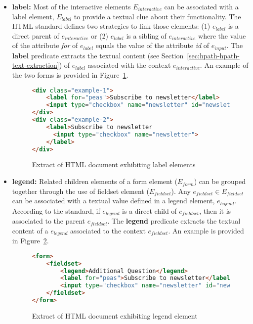 \begin{itemize}
    \item \textbf{label:} Most of the interactive elements $E_{interactive}$ can be associated with a label element, $E_{label}$ to provide a textual clue about their functionality. The HTML standard defines two strategies to link those elements: (1) $e_{label}$ is a direct parent of $e_{interactive}$ or (2) $e_{label}$ is a sibling of $e_{interactive}$ where the value of the attribute \emph{for} of $e_{label}$ equals the value of the attribute \emph{id} of $e_{input}$. The \textbf{label} predicate extracts the textual content (see Section~\ref{sec:hpath-hpath-text-extraction}) of $e_{label}$ associated with the context $e_{interactive}$. An example of the two forms is provided in Figure~\ref{fig:html-document-label}.
    
\begin{figure}[h]
\centering
\caption{Extract of HTML document exhibiting label elements}
\label{fig:html-document-label}
\begin{minipage}{0.8\linewidth}
\begin{lstlisting}[language=HTML]
<div class="example-1">
    <label for="peas">Subscribe to newsletter</label>
    <input type="checkbox" name="newsletter" id="newsletter">
</div>
<div class="example-2">
    <label>Subscribe to newsletter
      <input type="checkbox" name="newsletter">
    </label>
</div>
\end{lstlisting}
\end{minipage}
\end{figure}
    
    \item \textbf{legend:} Related children elements of a form element ($E_{form}$) can be grouped together through the use of fieldset element ($E_{fieldset}$). Any $e_{fieldset} \in E_{fieldset}$ can be associated with a textual value defined in a legend element, $e_{legend}$. According to the standard, if $e_{legend}$ is a direct child of $e_{fieldset}$, then it is associated to the parent $e_{fieldset}$. The \textbf{legend} predicate extracts the textual content of a $e_{legend}$ associated to the context $e_{fieldset}$. An example is provided in Figure~\ref{fig:html-document-legend}.

\begin{figure}[h]
\centering
\caption{Extract of HTML document exhibiting legend element}
\label{fig:html-document-legend}
\begin{minipage}{0.8\linewidth}
\begin{lstlisting}[language=HTML]
<form>
    <fieldset>
        <legend>Additional Question</legend>
        <label for="peas">Subscribe to newsletter</label>
        <input type="checkbox" name="newsletter" id="newsletter">
    </fieldset>
</form>
\end{lstlisting}
\end{minipage}
\end{figure}
    

\end{itemize}
